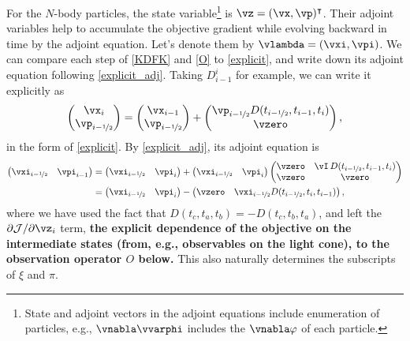 \documentclass[modern, dvipsnames]{aastex631}
\newcommand{\p}{\partial}
\newcommand{\cJ}{\mathcal{J}}
\newcommand{\half}{\nicefrac12}
\newcommand{\HL}[1]{\textcolor{Bittersweet}{\textbf{#1}}}
\begin{document}
For the $N$-body particles, the state variable\footnote{State and
adjoint vectors in the adjoint equations include enumeration of
particles, e.g., $\vnabla\vvarphi$ includes the $\vnabla\varphi$ of each
particle.} is $\vz = (\vx, \vp)^\intercal$.
Their adjoint variables help to accumulate the objective gradient while
evolving backward in time by the adjoint equation.
Let's denote them by $\vlambda = (\vxi, \vpi)$.
We can compare each step of \eqref{KDFK} and \eqref{O} to
\eqref{explicit}, and write down its adjoint equation following
\eqref{explicit_adj}.
Taking $D_{i-1}^i$ for example, we can write it explicitly as
%
\begin{equation*}
\begin{pmatrix} \vx_i \\ \vp_{i-\half} \end{pmatrix}
= \begin{pmatrix} \vx_{i-1} \\ \vp_{i-\half} \end{pmatrix}
+ \begin{pmatrix}
    \vp_{i-\half} D(t_{i-\half}, t_{i-1}, t_i) \\ \vzero
  \end{pmatrix},
\end{equation*}
%
in the form of \eqref{explicit}.
By \eqref{explicit_adj}, its adjoint equation is
%
\begin{align*}
\begin{pmatrix} \vxi_{i-\half} & \vpi_{i-1} \end{pmatrix}
&= \begin{pmatrix} \vxi_{i-\half} & \vpi_i \end{pmatrix}
+ \begin{pmatrix} \vxi_{i-\half} & \vpi_i \end{pmatrix}
  \begin{pmatrix}
    \vzero & \vI \, D(t_{i-\half}, t_{i-1}, t_i) \\
    \vzero & \vzero \\
  \end{pmatrix} \\
%
&= \begin{pmatrix} \vxi_{i-\half} & \vpi_i \end{pmatrix}
- \begin{pmatrix}
    \vzero & \vxi_{i-\half} D(t_{i-\half}, t_i, t_{i-1})
  \end{pmatrix},
\end{align*}
%
where we have used the fact that $D(t_c, t_a, t_b) = - D(t_c, t_b,
t_a)$, and left the $\p\cJ / \p\vz_i$ term, \HL{the explicit dependence of
the objective on the intermediate states (from, e.g., observables on the
light cone), to the observation operator $O$ below.}
This also naturally determines the subscripts of $\xi$ and $\pi$.
\end{document}
